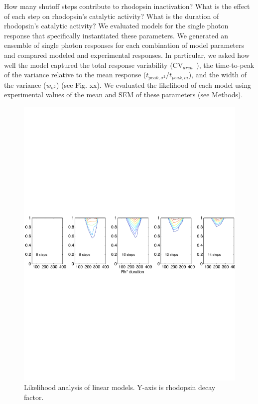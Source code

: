 \documentclass[12pt]{article}
\def\CVArea{CV$_{area}$~}
\def\tpeakratio{$t_{peak, \sigma^2} / t_{peak, m}$}
\begin{document}
How many shutoff steps contribute to rhodopsin inactivation?  What is the effect of each step on rhodopsin's catalytic activity?  What is the duration of rhodopsin's catalytic activity?  We evaluated models for the single photon response that specifically instantiated these parameters.  We generated an ensemble of single photon responses for each combination of model parameters and compared modeled and experimental responses.  In particular, we asked how well the model captured the total response variability (\CVArea), the time-to-peak of the variance relative to the mean response (\tpeakratio), and the width of the variance ($w_{\sigma^2}$) (see Fig. xx).  We evaluated the likelihood of each model using experimental values of the mean and SEM of these parameters (see Methods). 

\begin{figure}[h]
\begin{center}
\includegraphics[width=6in]{likelihood_wt.pdf}
\caption{Likelihood analysis of linear models. Y-axis is rhodopsin decay factor.}
\label{fig:likelihood}
\end{center}
\end{figure}
\end{document}

